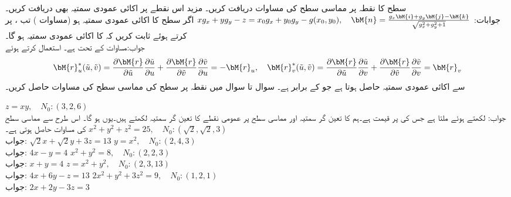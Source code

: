 \quad سطح  کا نقطہ  پر مماسی سطح کی مساوات دریافت کریں۔ مزید اس نقطے پر اکائی عمودی سمتیہ بھی دریافت کریں۔\\
جوابات:\quad
$xg_x+yg_y-z=x_0g_x+y_0g_y-g(x_0,y_0),\quad \bM{n}=\tfrac{g_x\bM{i}+g_y\bM{j}-\bM{k}}{\sqrt{g_x^2+g_y^2+1}}$
\quad اگر سطح  کا اکائی عمودی سمتیہ   ہو  (مساوات ) تب ،  پر کرتے ہوئے ثابت کریں کہ   کا اکائی عمودی سمتیہ  ہو گا۔ \\
جواب:\quad مساوات  کے تحت  ہے۔   استعمال کرتے ہوئے 
\begin{align*}
\bM{r}_u^*(\tilde{u},\tilde{v})=\frac{\partial \bM{r}}{\partial \tilde{u}}\frac{\partial \tilde{u}}{\partial u}+\frac{\partial \bM{r}}{\partial \tilde{v}}\frac{\partial \tilde{v}}{\partial u}=-\bM{r}_u,\quad
\bM{r}_v^*(\tilde{u},\tilde{v})=\frac{\partial \bM{r}}{\partial \tilde{u}}\frac{\partial \tilde{u}}{\partial v}+\frac{\partial \bM{r}}{\partial \tilde{v}}\frac{\partial \tilde{v}}{\partial v}=\bM{r}_v
\end{align*}
سے اکائی عمودی سمتیہ  حاصل ہوتا ہے جو   کے برابر ہے۔
سوال  تا سوال  میں نقطہ  پر سطح  کی مماسی سطح کی مساوات حاصل کریں۔

\quad
$z=xy,\quad N_0:(3,2,6)$\\
جواب:\quad {} لکھتے ہوئے  ملتا ہے جس کی  پر قیمت 
 ہے۔ہم  کا تعین گر سمتیہ  اور مماسی سطح پر عمومی نقطے کا تعین گر سمتیہ   لکھتے ہیں۔یوں  ہو گا۔ اس طرح  سے  مماسی سطح کی مساوات   حاصل ہوتی ہے۔
\quad
$x^2+y^2+z^2=25,\quad N_0:(\sqrt{2},\sqrt{2},3)$\\
جواب:\quad 
$\sqrt{2}x+\sqrt{2}y+3z=13$
\quad
$y=x^2,\quad N_0:(2,4,3)$\\
جواب:\quad 
$4x-y=4$
\quad
$x^2+y^2=8,\quad N_0:(2,2,3)$\\
جواب:\quad 
$x+y=4$
\quad
$z=x^2+y^2,\quad N_0:(2,3,13)$\\
جواب:\quad 
$4x+6y-z=13$
\quad
$2x^2+y^2+3z^2=9,\quad N_0:(1,2,1)$\\
جواب:\quad 
$2x+2y-3z=3$
